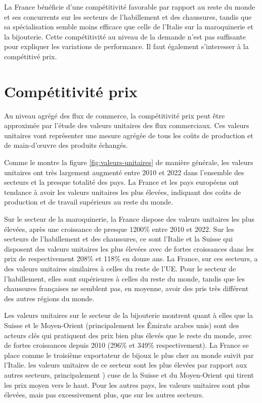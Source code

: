 \documentclass[french,10pt,a4paper]{article}
\begin{document}
La France bénéficie d'une compétitivité favorable par rapport au reste du monde et ses concurrents sur les secteurs de l'habillement et des chaussures, tandis que sa spécialisation semble moins efficace que celle de l'Italie sur la maroquinerie et la bijouterie. Cette compétitivité au niveau de la demande n'est pas suffisante pour expliquer les variations de performance. Il faut également s'interesser à la compétitivé prix.  

\section{Compétitivité prix}
Au niveau agrégé des flux de commerce, la compétitivité prix peut être approximée par l'étude des valeurs unitaires des flux commerciaux. Ces valeurs unitaires vont représenter une mesure agrégée de tous les coûts de production et de main-d'œuvre des produits échangés.

Comme le montre la figure \ref{fig:valeurs-unitaires} de manière générale, les valeurs unitaires ont très largement augmenté entre 2010 et 2022 dans l'ensemble des secteurs et la presque totalité des pays. La France et les pays européens ont tendance à avoir les valeurs unitaires les plus élevées, indiquant des coûts de production et de travail supérieurs au reste du monde.

Sur le secteur de la maroquinerie, la France dispose des valeurs unitaires les plus élevées, après une croissance de presque 1200\% entre 2010 et 2022. Sur les secteurs de l'habillement et des chaussures, ce sont l'Italie et la Suisse qui disposent des valeurs unitaires les plus élevées avec de fortes croissances dans les prix de respectivement 208\% et 118\% en douze ans. La France, sur ces secteurs, a des valeurs unitaires similaires à celles du reste de l'UE. Pour le secteur de l'habillement, elles sont supérieures à celles du reste du monde, tandis que les chaussures françaises ne semblent pas, en moyenne, avoir des pris très différent des autres régions du monde. 

Les valeurs unitaires sur le secteur de la bijouterie montrent quant à elles que la Suisse et le Moyen-Orient (principalement les Émirats arabes unis) sont des acteurs clés qui pratiquent des prix bien plus élevés que le reste du monde, avec de fortes croissances depuis 2010 (296\% et 349\% respectivement). La France se place comme le troisième exportateur de bijoux le plus cher au monde suivit par l'Italie. les valeurs unitaires de ce secteur sont les plus élevées par rapport aux autres secteurs, principalement ) cuse de la Suisse et du Moyen-Orient qui tirent les prix moyen vers le haut. Pour les autres pays, les valeurs unitaires sont plus élevées, mais pas excessivement plus, que sur les autres secteurs. 
\end{document}
